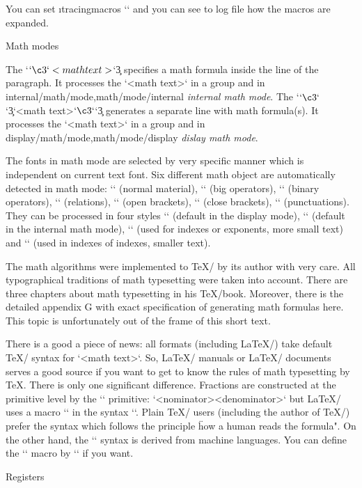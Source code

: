 {You can set \i tracingmacros `` and you can see to log file how the macros are expanded.

\sec Math modes

The `$`\c3`<math text>$`\c3 specifies a math formula inside the line of the
paragraph. It processes the `<math text>` in a group and in 
\ii internal/math/mode,math/mode/internal {\em internal math mode}. 
The `$`\c3`$`\c3`<math text>$`\c3`$`\c3 generates a separate line with math 
formula(s). It processes the `<math text>` in a group and in 
\ii display/math/mode,math/mode/display {\em dislay math mode}. 

The fonts in math mode are selected by very specific manner which is independent 
on current text font. Six different math object are automatically detected
in math mode: \x`\mathord` (normal material), \x`\mathop` (big operators),
\x`\mathbin` (binary operators), \x`\mathrel` (relations), \x`\mathopen` (open
brackets), \x`\mathclose` (close brackets), \x`\mathpunct` (punctuations). They
can be processed in four styles \x`\displaystyle` (default in the display mode),
\x`\textstyle` (default in the internal math mode), \x`\scriptstyle` (used for
indexes or exponents, more small text) and \x`\scriptscriptstyle` 
(used in indexes of indexes, smaller text).

The math algorithms were implemented to \TeX/ by its author with very care.
All typographical traditions of math typesetting were taken into account.
There are three chapters about math typesetting in his \TeX/book. Moreover,
there is the detailed appendix G with exact specification of generating math
formulas here. This topic is unfortunately out of the frame of this short
text.

There is a good a piece of news: all formats (including \LaTeX/) take default \TeX/
syntax for `<math text>`. So, \LaTeX/ manuals or \LaTeX/ documents
serves a good source if you want to get to know the rules of math typesetting
by \TeX. There is only one significant difference. Fractions are constructed at
the primitive level by the \x`\over` primitive:
`{<nominator>\over<denominator>}` but \LaTeX/ uses a macro \x`\frac` in the
syntax ``. Plain \TeX/ users (including the
author of \TeX/) prefer the syntax which follows the
principle \"how a human reads the formula". On the other hand, the 
\x`\frac` syntax is derived from machine languages. You can define the
\x`\frac` macro by  `\def\frac#1#2{{#1\over#2}}` if you want.


\sec[reg] Registers

}
